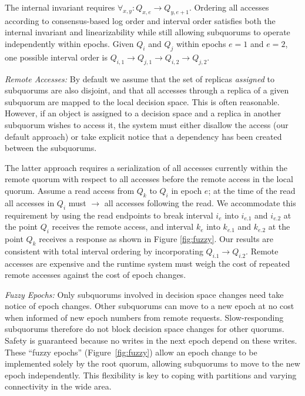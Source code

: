 \documentclass[sigconf]{acmart}
\begin{document}
The internal invariant requires $\forall_{x,y} : Q_{x,e} \rightarrow Q_{y,e+1}$.
Ordering all accesses according to consensus-based log order and interval order satisfies both the
internal invariant and linearizability  while still allowing subquorums to operate
independently within epochs.
Given $Q_i$ and $Q_j$ within epochs $e=1$ and $e=2$, one possible interval order is
$Q_{i,1} \rightarrow Q_{j,1} \rightarrow Q_{i,2} \rightarrow Q_{j,2}$.

\noindent
\textsl{Remote Accesses:}
By default we assume that the set of replicas \emph{assigned} to subquorums are also
disjoint, and that all accesses through a replica of a given subquorum are mapped to the
local decision space.
This is often reasonable.
However, if an object is assigned to a decision space and a replica in another subquorum
wishes to
access it, the system must either disallow the access (our default approach) or take
explicit notice that a dependency has been created between the subquorums.

The latter approach requires a serialization of all accesses currently within the remote
quorum with respect to all accesses before the remote access in the local quorum.
Assume a read access from $Q_k$ to $Q_i$ in epoch $e$; at the time of the read all
accesses in $Q_i$ must $\rightarrow$ all accesses following the read.
We accommodate this requirement by using the read endpoints to break interval $i_e$ into
$i_{e.1}$ and $i_{e.2}$ at the point $Q_i$ receives the remote access, and interval $k_e$
into $k_{e.1}$ and $k_{e.2}$ at the point $Q_k$ receives a response as shown in
Figure \ref{fig:fuzzy}.
Our results are consistent with total interval ordering by incorporating $Q_{i.1}
\rightarrow Q_{i.2}$.
Remote accesses are expensive and the runtime system must weigh the cost of repeated
remote accesses against the cost of epoch changes.

\vspace{.03in}
\noindent
\textsl{Fuzzy Epochs:}
Only subquorums involved in decision space changes need take notice of
epoch changes.
Other subquorums can move to a new epoch at no cost when informed of new epoch
numbers from remote requests.
Slow-responding subquorums therefore do not block decision space changes for other
quorums.
Safety is guaranteed because no writes in the next epoch depend on these writes.
These ``fuzzy epochs'' (Figure~\ref{fig:fuzzy}) allow an epoch change to be implemented solely by the
root quorum, allowing subquorums to move to the new epoch independently.
This flexibility is key to coping with partitions and varying connectivity in
the wide area.
\end{document}
